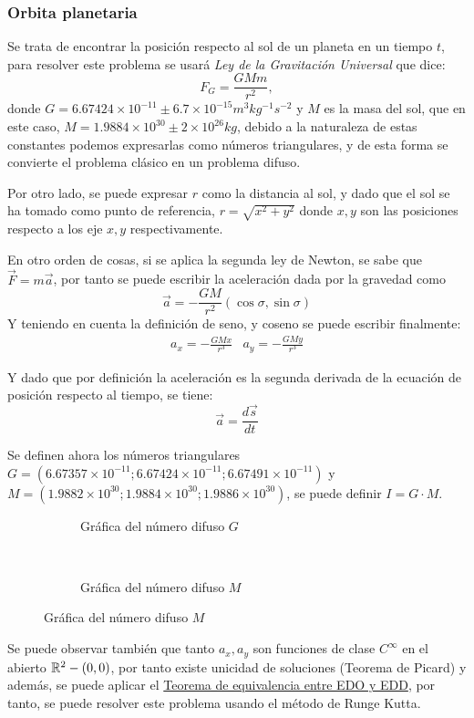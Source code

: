 \subsubsection{Orbita planetaria}
\begin{ejemplo}
	Se trata de encontrar la posición respecto al sol de un planeta en un tiempo $t$, para resolver este problema se usará \textit{Ley de la Gravitación Universal} que dice:
	\[
	F_G = \frac{GM m}{r^2},
	\]
	donde $G=6.67424 \times 10^{-11} \pm 6.7 \times 10^{-15} m^3 kg^{-1} s^{-2}$ y $M$ es la masa del sol, que en este caso, $M=1.9884\times 10^{30} \pm 2 \times 10^{26} kg$, debido a la naturaleza de estas constantes podemos expresarlas como números triangulares, y de esta forma se convierte el problema clásico en un problema difuso.
	
	Por otro lado, se puede expresar $r$ como la distancia al sol, y dado que el sol se ha tomado como punto de referencia, $r=\sqrt{x^2+y^2}$ donde $x, y$ son las posiciones respecto a los eje $x, y$ respectivamente.
	
	En otro orden de cosas, si se aplica la segunda ley de Newton, se sabe que $\vec{F} = m \vec{a}$, por tanto se puede escribir la aceleración dada por la gravedad como 
	\[
	\vec{a} = -\frac{GM}{r^2} \left(
	\cos{\sigma}, \sin{\sigma}
	\right)
	\]
	Y teniendo en cuenta la definición de seno, y coseno se puede escribir finalmente:
	\[
	\begin{array}{l||r}
	a_x = - \frac{GMx}{r^3} & a_y = - \frac{GMy}{r^3}
	\end{array}
	\]
	
	Y dado que por definición la aceleración es la segunda derivada de la ecuación de posición respecto al tiempo, se tiene:
	\[
	\vec{a} = \frac{d\vec{s}}{dt}
	\]
	
	Se definen ahora los números triangulares $G=(6.67357\times10^{-11};6.67424 \times 10^{-11};6.67491\times10^{-11})$ y $M=(1.9882\times10^{30};1.9884\times 10^{30}
	;1.9886\times10^{30})$, se puede definir $I=G\cdot M$.
	
	
	\begin{figure}[h]
		\centering
		\begin{subfigure}[b]{0.49\textwidth}
			\caption{Gráfica del número difuso $G$}
			\label{fig:triangular_g}
		\end{subfigure}
		~ 
		\begin{subfigure}[b]{0.49\textwidth}
			\caption{Gráfica del número difuso $M$}
			\label{fig:triangular_m}
		\end{subfigure}
	\end{figure}
	
	Se puede observar también que tanto $a_x, a_y$ son funciones de clase $C^\infty$ en el abierto $\mathbb R^2 - (0, 0)$, por tanto existe unicidad de soluciones (Teorema de Picard) y además, se puede aplicar el \hyperref[teorema:equivalencia]{Teorema de equivalencia entre EDO y EDD}, por tanto, se puede resolver este problema usando el método de Runge Kutta.
	
\end{ejemplo}

